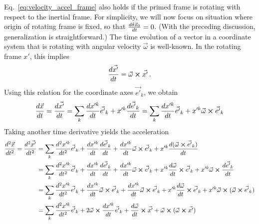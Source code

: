 \documentclass[../class_mech_main.tex]{subfiles}
\begin{document}
Eq.~\eqref{eq:velocity_accel_frame} also holds if the primed frame is rotating with respect to the inertial frame. For simplicity, we will now focus on situation where origin of rotating frame is fixed, so that $\dv{\delta \vec{x}_0}{t} = 0$. (With the preceding discussion, generalization is straightforward.) The time evolution of a vector in a coordinate system that is rotating with angular velocity $\vec{\omega}$ is well-known.  In the rotating frame $x'$, this implies
\begin{equation}
    \dv{\vec{x'}}{t} = \vec{\omega} \cross \vec{x'} \, .
\end{equation}
Using this relation for the coordinate axes $\vec{e'}_k$, we obtain
\begin{equation}
    \dv{\vec{x}}{t} = \dv{\vec{x'}}{t} = \sum_k \dv{x'^k}{t} \vec{e'}_k + x'^k \dv{\vec{e'}_k}{t} = \sum_k \dv{x'^k}{t} \vec{e'}_k + x'^k \vec{\omega} \cross \vec{e'}_k
\end{equation}
Taking another time derivative yields the acceleration
\begin{align}
    \dv[2]{\vec{x}}{t} = \dv[2]{\vec{x'}}{t}
    &= \sum_k \dv[2]{x'^k}{t} \vec{e'}_k + \dv{x'^k}{t} \dv{\vec{e'}_k}{t} + \dv{x'^k}{t} \vec{\omega} \cross \vec{e'}_k + x'^k \dv{(\vec{\omega} \cross \vec{e'}_k)}{t}
    \notag\\
    &= \sum_k \dv[2]{x'^k}{t} \vec{e'}_k + \dv{x'^k}{t} \dv{\vec{e'}_k}{t} + \dv{x'^k}{t} \vec{\omega} \cross \vec{e'}_k + x'^k \dv{\vec{\omega}}{t} \cross \vec{e'}_k + x'^k \vec{\omega} \cross \dv{\vec{e'}_k}{t}
    \notag\\
    &= \sum_k \dv[2]{x'^k}{t} \vec{e'}_k + \dv{x'^k}{t} \vec{\omega} \cross \vec{e'}_k + \dv{x'^k}{t} \vec{\omega} \cross \vec{e'}_k + x'^k \dv{\vec{\omega}}{t} \cross \vec{e'}_k + x'^k \vec{\omega} \cross (\vec{\omega} \cross \vec{e'}_k)
    \notag\\
    &= \sum_k \dv[2]{x'^k}{t} \vec{e'}_k + 2 \vec{\omega} \cross \dv{x'^k}{t} \vec{e'}_k + \dv{\vec{\omega}}{t} \cross \vec{x'} + \vec{\omega} \cross (\vec{\omega} \cross \vec{x'})
    \label{eq:acceleration_in_rot_frame}
\end{align}
\end{document}
